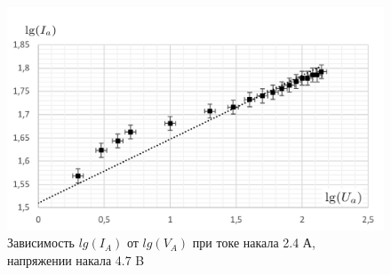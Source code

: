 \documentclass[a4paper]{article}
\begin{document}
\begin{figure}[h]
\begin{center}
\includegraphics[width=13cm]{2_4.png}
\caption{Зависимость $lg(I_A)$ от $lg(V_A)$ при токе накала 2.4 А, напряжении накала 4.7 B}
\end{center}
\end{figure}
\end{document}
